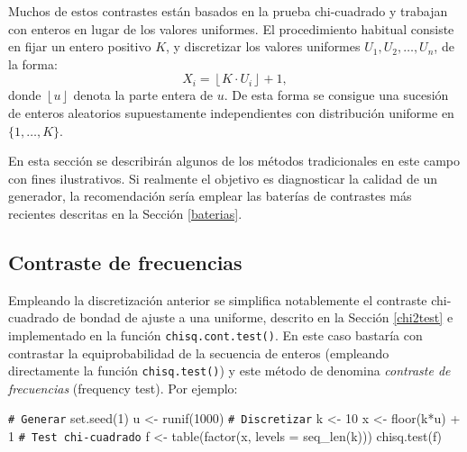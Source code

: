 \documentclass[
  10pt,
]{book}
\newenvironment{Shaded}{\begin{snugshade}}{\end{snugshade}}
\newcommand{\AttributeTok}[1]{\textcolor[rgb]{0.77,0.63,0.00}{#1}}
\newcommand{\CommentTok}[1]{\textcolor[rgb]{0.56,0.35,0.01}{\textit{#1}}}
\newcommand{\DecValTok}[1]{\textcolor[rgb]{0.00,0.00,0.81}{#1}}
\newcommand{\FunctionTok}[1]{\textcolor[rgb]{0.00,0.00,0.00}{#1}}
\newcommand{\NormalTok}[1]{#1}
\newcommand{\OtherTok}[1]{\textcolor[rgb]{0.56,0.35,0.01}{#1}}
\newcommand{\SpecialCharTok}[1]{\textcolor[rgb]{0.00,0.00,0.00}{#1}}
\theoremstyle{break}
\theoremstyle{nonumberplain}
\renewcommand{\CommentTok}[1]{\textcolor[rgb]{0.41,0.41,0.41}{\texttt{#1}}}
\begin{document}
Muchos de estos contrastes están basados en la prueba chi-cuadrado y trabajan con enteros en lugar de los valores uniformes. El procedimiento habitual consiste en fijar un entero positivo \(K\), y discretizar los valores uniformes \(U_{1},U_{2},\ldots,U_{n}\), de la forma:
\[X_i = \left\lfloor K\cdot U_{i}\right\rfloor + 1 ,\]
donde \(\left\lfloor u\right\rfloor\) denota la parte entera de \(u\).
De esta forma se consigue una sucesión de enteros aleatorios supuestamente independientes con distribución uniforme en \(\{1, \ldots, K\}\).

En esta sección se describirán algunos de los métodos tradicionales en este campo con fines ilustrativos. Si realmente el objetivo es diagnosticar la calidad de un generador, la recomendación sería emplear las baterías de contrastes más recientes descritas en la Sección \ref{baterias}.

\hypertarget{freq-test}{%
\subsection{Contraste de frecuencias}\label{freq-test}}

Empleando la discretización anterior se simplifica notablemente el contraste chi-cuadrado de bondad de ajuste a una uniforme, descrito en la Sección \ref{chi2test} e implementado en la función \texttt{chisq.cont.test()}.
En este caso bastaría con contrastar la equiprobabilidad de la secuencia de enteros (empleando directamente la función \texttt{chisq.test()}) y este método de denomina \emph{contraste de frecuencias} (frequency test).
Por ejemplo:

\begin{Shaded}
\begin{Highlighting}[]
\CommentTok{\# Generar}
\FunctionTok{set.seed}\NormalTok{(}\DecValTok{1}\NormalTok{)}
\NormalTok{u }\OtherTok{\textless{}{-}} \FunctionTok{runif}\NormalTok{(}\DecValTok{1000}\NormalTok{)}
\CommentTok{\# Discretizar}
\NormalTok{k }\OtherTok{\textless{}{-}} \DecValTok{10}
\NormalTok{x }\OtherTok{\textless{}{-}} \FunctionTok{floor}\NormalTok{(k}\SpecialCharTok{*}\NormalTok{u) }\SpecialCharTok{+} \DecValTok{1}
\CommentTok{\# Test chi{-}cuadrado}
\NormalTok{f }\OtherTok{\textless{}{-}} \FunctionTok{table}\NormalTok{(}\FunctionTok{factor}\NormalTok{(x, }\AttributeTok{levels =} \FunctionTok{seq\_len}\NormalTok{(k)))}
\FunctionTok{chisq.test}\NormalTok{(f)}
\end{Highlighting}
\end{Shaded}
\end{document}
